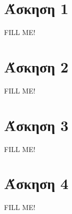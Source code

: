 \documentclass[a4paper,11pt]{article}
\begin{document}
\renewcommand{\labelenumi}{\roman{enumi})}
\renewcommand{\labelenumii}{(\arabic{enumii})}



\section{Άσκηση 1} \setcounter{section}{1}

FILL ME!


\section{Άσκηση 2} \setcounter{section}{1}

FILL ME!


\section{Άσκηση 3} \setcounter{section}{1}

FILL ME!


\section{Άσκηση 4} \setcounter{section}{1}

FILL ME!

\end{document}

